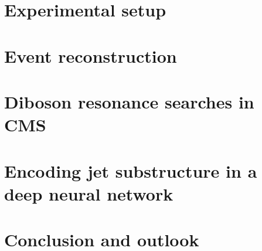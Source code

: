 \documentclass[12pt,USenglish,a4]{book}
\begin{document}
\chapter{Experimental setup}
\label{ch:CMS}
\vspace*{\fill}\newpage


\chapter{Event reconstruction} %
\label{ch:objreco}
\vspace*{\fill}\newpage


\chapter{Diboson resonance searches in CMS}
\label{ch:diboson}
\vspace*{\fill}\newpage


\chapter{Encoding jet substructure in a deep neural network}
\label{ch:lola}
\vspace*{\fill}\newpage

	
\chapter{Conclusion and outlook}		
\label{ch:summary}
\vspace*{\fill}\newpage			

\clearpage

\newpage\thispagestyle{empty}\mbox{}

\appendix
\label{app}
\vspace*{\fill}\newpage



\newpage





\end{document}
